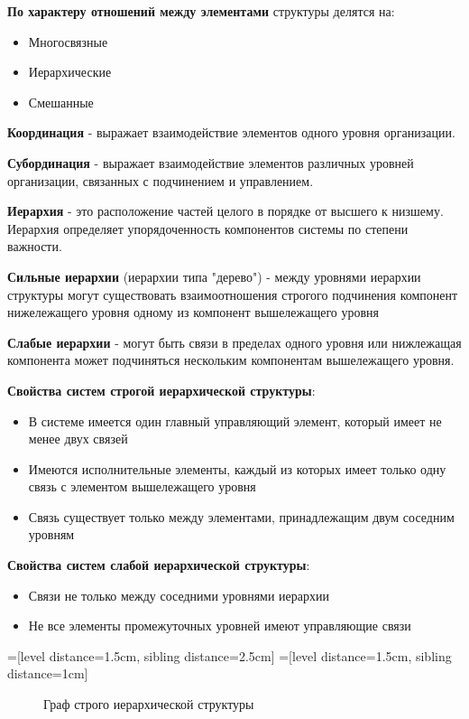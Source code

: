 \documentclass[a4paper]{article}
\begin{document}
	\textbf{По характеру отношений между элементами} структуры делятся на:
			\begin{itemize}
				\item Многосвязные
				\item Иерархические
				\item Смешанные
	\end{itemize}

	\textbf{Координация} - выражает взаимодействие элементов одного уровня организации.


	\textbf{Субординация} - выражает взаимодействие элементов различных уровней организации, связанных с подчинением и управлением.
	
	\textbf{Иерархия} - это расположение частей целого в порядке от высшего к низшему. Иерархия определяет упорядоченность компонентов системы по степени важности.
	
	\textbf{Сильные иерархии} (иерархии типа "дерево") -  между уровнями иерархии структуры могут существовать взаимоотношения строгого подчинения компонент нижележащего уровня одному из компонент вышележащего уровня
	
	\textbf{Слабые иерархии} - могут быть связи в пределах одного уровня или нижлежащая компонента может подчиняться нескольким компонентам вышележащего уровня.
	
	\textbf{Свойства систем строгой иерархической структуры}:
	\begin{itemize}
		\item В системе имеется один главный управляющий элемент, который имеет не менее двух связей
		\item Имеются исполнительные элементы, каждый из которых имеет только одну связь с элементом вышележащего уровня
		\item Связь существует только между элементами, принадлежащим двум соседним уровням
	\end{itemize}

	\textbf{Свойства систем слабой иерархической структуры}:
	\begin{itemize}
		\item Связи не только между соседними уровнями иерархии
		\item Не все элементы промежуточных уровней имеют управляющие связи
	\end{itemize}
	
	=[level distance=1.5cm, sibling distance=2.5cm]
	=[level distance=1.5cm, sibling distance=1cm]
	
	\begin{figure}[h]
		\centering
		\medskip
		\caption{Граф строго иерархической структуры} 
	\end{figure}
\end{document}
